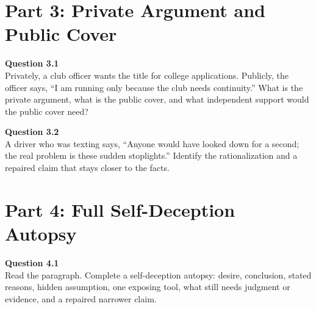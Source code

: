 \documentclass[12pt]{article}
\begin{document}

\newpage

\section*{Part 3: Private Argument and Public Cover}

\textbf{Question 3.1}\\[-0.15em]
Privately, a club officer wants the title for college applications. Publicly, the officer says, ``I am running only because the club needs continuity.'' What is the private argument, what is the public cover, and what independent support would the public cover need?


\textbf{Question 3.2}\\[-0.15em]
A driver who was texting says, ``Anyone would have looked down for a second; the real problem is these sudden stoplights.'' Identify the rationalization and a repaired claim that stays closer to the facts.


\newpage

\section*{Part 4: Full Self-Deception Autopsy}

\textbf{Question 4.1}\\[-0.15em]
Read the paragraph. Complete a self-deception autopsy: desire, conclusion, stated reasons, hidden assumption, one exposing tool, what still needs judgment or evidence, and a repaired narrower claim.

\vspace{0.2em}

\noindent{}
\end{document}
